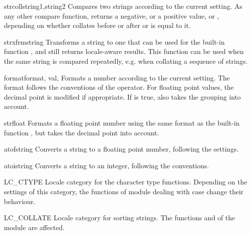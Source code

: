 \begin{funcdesc}{strcoll}{string1,string2}
Compares two strings according to the current 
setting. As any other compare function, returns a negative, or a
positive value, or , depending on whether 
collates before or after  or is equal to it.
\end{funcdesc}

\begin{funcdesc}{strxfrm}{string}
Transforms a string to one that can be used for the built-in function
, and still returns locale-aware
results.  This function can be used when the same string is compared
repeatedly, e.g. when collating a sequence of strings.
\end{funcdesc}

\begin{funcdesc}{format}{format, val, }
Formats a number  according to the current
 setting.  The format follows the conventions of
the \code{\%} operator.  For floating point values, the decimal point
is modified if appropriate.  If  is true, also takes the
grouping into account.
\end{funcdesc}

\begin{funcdesc}{str}{float}
Formats a floating point number using the same format as the built-in
function , but takes the decimal point into
account.
\end{funcdesc}

\begin{funcdesc}{atof}{string}
Converts a string to a floating point number, following the
 settings.
\end{funcdesc}

\begin{funcdesc}{atoi}{string}
Converts a string to an integer, following the 
conventions.
\end{funcdesc}

\begin{datadesc}{LC_CTYPE}
Locale category for the character type functions. Depending on the
settings of this category, the functions of module 
dealing with case change their behaviour.
\end{datadesc}

\begin{datadesc}{LC_COLLATE}
Locale category for sorting strings. The functions
 and  of the 
module are affected.
\end{datadesc}

